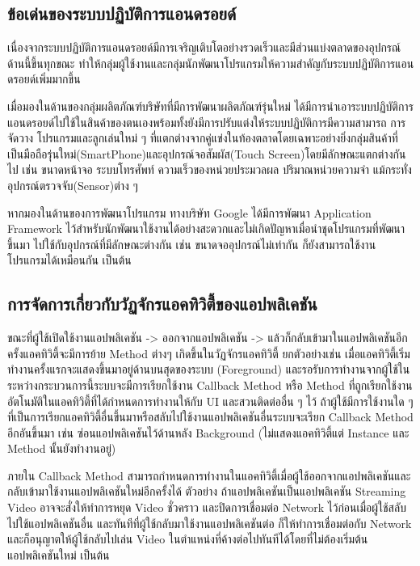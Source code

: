 	\subsection{ข้อเด่นของระบบปฏิบัติการแอนดรอยด์}
	เนื่องจากระบบปฏิบัติการแอนดรอยด์มีการเจริญเติบโตอย่างรวดเร็วและมีส่วนแบ่งตลาดของอุปกรณ์ด้านนี้ขึ้นทุกขณะ ทำให้กลุ่มผู้ใช้งานและกลุ่มนักพัฒนาโปรแกรมให้ความสำคัญกับระบบปฏิบัติการแอนดรอยด์เพิ่มมากขึ้น
	
	เมื่อมองในด้านของกลุ่มผลิตภัณฑ์บริษัทที่มีการพัฒนาผลิตภัณฑ์รุ่นใหม่ ได้มีการนำเอาระบบปฏิบัติการแอนดรอยด์ไปใช้ในสินค้าของตนเองพร้อมทั้งยังมีการปรับแต่งให้ระบบปฏิบัติการมีความสามารถ การจัดวาง โปรแกรมและลูกเล่นใหม่ ๆ ที่แตกต่างจากคู่แข่งในท้องตลาดโดยเฉพาะอย่างยิ่งกลุ่มสินค้าที่เป็นมือถือรุ่นใหม่(SmartPhone)และอุปกรณ์จอสัมผัส(Touch Screen)โดยมีลักษณะแตกต่างกันไป เช่น ขนาดหน้าจอ ระบบโทรศัพท์ ความเร็วของหน่วยประมวลผล ปริมาณหน่วยความจำ แม้กระทั่งอุปกรณ์ตรวจจับ(Sensor)ต่าง ๆ 
	
	หากมองในด้านของการพัฒนาโปรแกรม ทางบริษัท Google ได้มีการพัฒนา Application Framework ไว้สำหรับนักพัฒนาใช้งานได้อย่างสะดวกและไม่เกิดปัญหาเมื่อนำชุดโปรแกรมที่พัฒนาขึ้นมา ไปใช้กับอุปกรณ์ที่มีลักษณะต่างกัน เช่น ขนาดจออุปกรณ์ไม่เท่ากัน ก็ยังสามารถใช้งานโปรแกรมได้เหมือนกัน เป็นต้น
	
	\subsection{การจัดการเกี่ยวกับวัฏจักรแอคทิวิตี้ของแอปพลิเคชัน}
	
	ขณะที่ผู้ใช้เปิดใช้งานแอปพลิเคชัน -> ออกจากแอปพลิเคชัน -> แล้วก็กลับเข้ามาในแอปพลิเคชันอีกครั้งแอคทิวิตี้จะมีการย้าย Method ต่างๆ เกิดขึ้นในวัฏจักรแอคทิวิตี้ ยกตัวอย่างเช่น 
	เมื่อแอคทิวิตี้เริ่มทำงานครั้งแรกจะแสดงขึ้นมาอยู่ด้านบนสุดของระบบ (Foreground) และรอรับการทำงานจากผู้ใช้ในระหว่างกระบวนการนี้ระบบจะมีการเรียกใช้งาน Callback Method หรือ Method ที่ถูกเรียกใช้งานอัตโนมัติในแอคทิวิตี้ที่ได้กำหนดการทำงานให้กับ UI และสวนติดต่ออื่น ๆ ไว้ ถ้าผู้ใช้มีการใช้งานใด ๆ ที่เป็นการเรียกแอคทิวิตี้อื่นขึ้นมาหรือสลับไปใช้งานแอปพลิเคชันอื่นระบบจะเรียก Callback Method อีกอันขึ้นมา เช่น ซ่อนแอปพลิเคชันไว้ด้านหลัง Background (ไม่แสดงแอคทิวิตี้แต่ Instance และ Method นั้นยังทำงานอยู่)
	
	ภายใน Callback Method สามารถกำหนดการทำงานในแอคทิวิตี้เมื่อผู้ใช้ออกจากแอปพลิเคชันและกลับเข้ามาใช้งานแอปพลิเคชันใหม่อีกครั้งได้ ตัวอย่าง ถ้าแอปพลิเคชันเป็นแอปพลิเคชัน Streaming Video
	อาจจะสั่งให้ทำการหยุด Video ชั่วคราว และปิดการเชื่อมต่อ Network ไว้ก่อนเมื่อผู้ใช้สลับไปใช้แอปพลิเคชันอื่น
	และทันทีที่ผู้ใช้กลับมาใช้งานแอปพลิเคชันต่อ ก็ให้ทำการเชื่อมต่อกับ Network และก็อนุญาตให้ผู้ใช้กลับไปเล่น Video
	ในตำแหน่งที่ค้างต่อไปทันทีได้โดยที่ไม่ต้องเริ่มต้นแอปพลิเคชันใหม่ เป็นต้น
	
